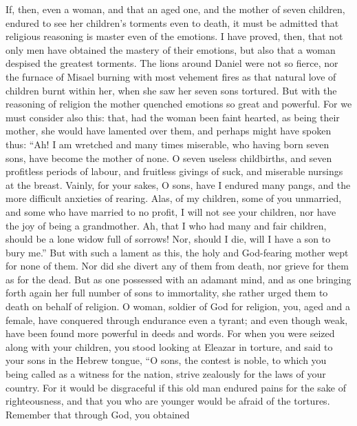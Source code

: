  If, then, even a woman, and that an aged one, and the
mother of seven children, endured to see her children's torments even to
death, it must be admitted that religious reasoning is master even of
the emotions.  I have proved, then, that not only men have
obtained the mastery of their emotions, but also that a woman despised
the greatest torments.  The lions around Daniel were not so
fierce, nor the furnace of Misael burning with most vehement fires as
that natural love of children burnt within her, when she saw her seven
sons tortured.  But with the reasoning of religion the
mother quenched emotions so great and powerful.  For we must
consider also this: that, had the woman been faint hearted, as being
their mother, she would have lamented over them, and perhaps might have
spoken thus:  ``Ah! I am wretched and many times miserable,
who having born seven sons, have become the mother of none. 
O seven useless childbirths, and seven profitless periods of labour, and
fruitless givings of suck, and miserable nursings at the breast.
 Vainly, for your sakes, O sons, have I endured many pangs,
and the more difficult anxieties of rearing.  Alas, of my
children, some of you unmarried, and some who have married to no profit,
I will not see your children, nor have the joy of being a grandmother.
 Ah, that I who had many and fair children, should be a
lone widow full of sorrows!  Nor, should I die, will I have
a son to bury me.'' But with such a lament as this, the holy and
God-fearing mother wept for none of them.  Nor did she
divert any of them from death, nor grieve for them as for the dead.
 But as one possessed with an adamant mind, and as one
bringing forth again her full number of sons to immortality, she rather
urged them to death on behalf of religion.  O woman,
soldier of God for religion, you, aged and a female, have conquered
through endurance even a tyrant; and even though weak, have been found
more powerful in deeds and words.  For when you were seized
along with your children, you stood looking at Eleazar in torture, and
said to your sons in the Hebrew tongue,  ``O sons, the
contest is noble, to which you being called as a witness for the nation,
strive zealously for the laws of your country.  For it
would be disgraceful if this old man endured pains for the sake of
righteousness, and that you who are younger would be afraid of the
tortures.  Remember that through God, you obtained
